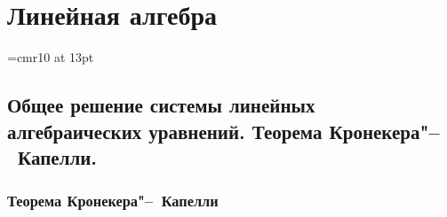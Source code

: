 \part[Линейная алгебра]{Линейная алгебра}

\font\Large=cmr10 at 13pt
\newcount\rowcount{}
\def\fudge#1{\smash{\hbox{\Large#1}}}
\def\doublyso{\kern+2em\smash{\vrule height \rowcount em depth .2em}\hidewidth}			%

\chapter{Общее решение системы линейных алгебраических уравнений. Теорема Кронекера"--~Капелли.}\label{chapter21}
\section{Теорема Кронекера"--~Капелли}

